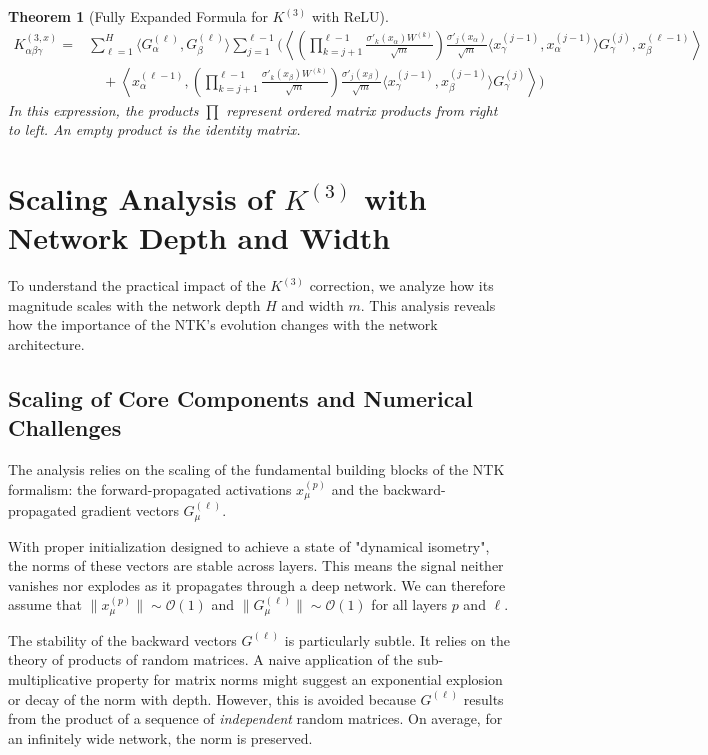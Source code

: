 \documentclass{article}
\newtheorem{theorem}{Theorem}[section]
\newcommand{\Order}{\mathcal{O}}
\begin{document}
\begin{theorem}[Fully Expanded Formula for $K^{(3)}$ with ReLU]
\begin{align}
K^{(3,x)}_{\alpha\beta\gamma} = & \sum_{\ell=1}^{H} \langle G^{(\ell)}_\alpha, G^{(\ell)}_\beta \rangle \sum_{j=1}^{\ell-1} \Biggl( \left\langle \left( \prod_{k=j+1}^{\ell-1} \frac{\sigma'_{k}(x_\alpha) W^{(k)}}{\sqrt{m}} \right) \frac{\sigma'_{j}(x_\alpha)}{\sqrt{m}} \langle x^{(j-1)}_\gamma, x^{(j-1)}_\alpha \rangle G^{(j)}_\gamma, x^{(\ell-1)}_\beta \right\rangle \nonumber \\
& \quad + \left\langle x^{(\ell-1)}_\alpha, \left( \prod_{k=j+1}^{\ell-1} \frac{\sigma'_{k}(x_\beta) W^{(k)}}{\sqrt{m}} \right) \frac{\sigma'_{j}(x_\beta)}{\sqrt{m}} \langle x^{(j-1)}_\gamma, x^{(j-1)}_\beta \rangle G^{(j)}_\gamma \right\rangle \Biggr)
\end{align}
In this expression, the products $\prod$ represent ordered matrix products from right to left. An empty product is the identity matrix.
\end{theorem}


\section{Scaling Analysis of $K^{(3)}$ with Network Depth and Width}

To understand the practical impact of the $K^{(3)}$ correction, we analyze how its magnitude scales with the network depth $H$ and width $m$. This analysis reveals how the importance of the NTK's evolution changes with the network architecture.

\subsection{Scaling of Core Components and Numerical Challenges}

The analysis relies on the scaling of the fundamental building blocks of the NTK formalism: the forward-propagated activations $x^{(p)}_\mu$ and the backward-propagated gradient vectors $G^{(\ell)}_\mu$.

With proper initialization designed to achieve a state of "dynamical isometry", the norms of these vectors are stable across layers. This means the signal neither vanishes nor explodes as it propagates through a deep network. We can therefore assume that $\|x^{(p)}_\mu\| \sim \Order(1)$ and $\|G^{(\ell)}_\mu\| \sim \Order(1)$ for all layers $p$ and $\ell$.

The stability of the backward vectors $G^{(\ell)}$ is particularly subtle. It relies on the theory of products of random matrices. A naive application of the sub-multiplicative property for matrix norms might suggest an exponential explosion or decay of the norm with depth. However, this is avoided because $G^{(\ell)}$ results from the product of a sequence of \textit{independent} random matrices. On average, for an infinitely wide network, the norm is preserved.
\end{document}
